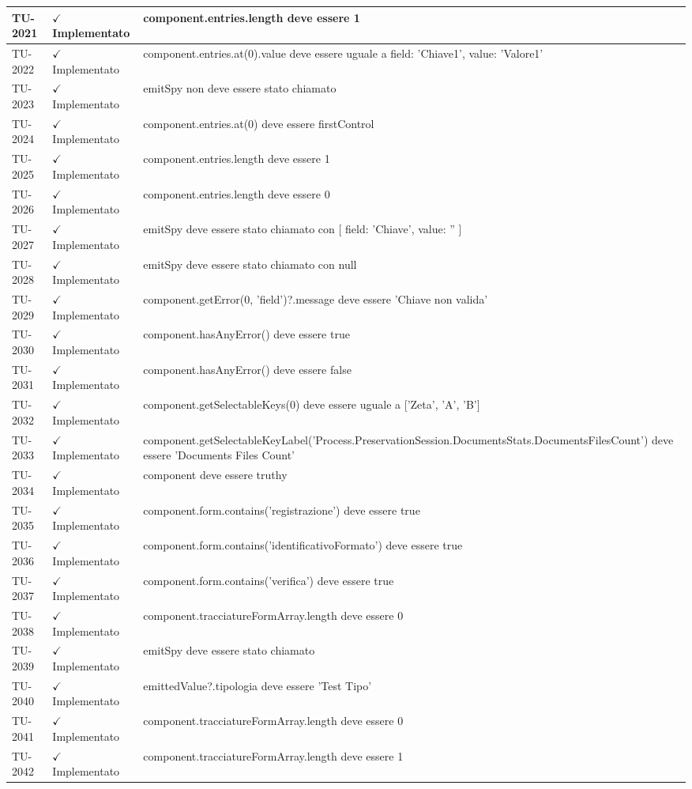 ﻿\documentclass[a4paper,12pt]{article}
\newcommand{\ok}{\textcolor{green!60!black}{$\checkmark$ Implementato}}
\begin{document}
\begin{longtable}{|p{2cm}|p{3.5cm}|p{9.5cm}|}
\hline
TU-2021 & \ok & component.entries.length deve essere 1 \\
\hline
TU-2022 & \ok & component.entries.at(0).value deve essere uguale a { field: 'Chiave1', value: 'Valore1' } \\
\hline
TU-2023 & \ok & emitSpy non deve essere stato chiamato \\
\hline
TU-2024 & \ok & component.entries.at(0) deve essere firstControl \\
\hline
TU-2025 & \ok & component.entries.length deve essere 1 \\
\hline
TU-2026 & \ok & component.entries.length deve essere 0 \\
\hline
TU-2027 & \ok & emitSpy deve essere stato chiamato con [{ field: 'Chiave', value: '' }] \\
\hline
TU-2028 & \ok & emitSpy deve essere stato chiamato con null \\
\hline
TU-2029 & \ok & component.getError(0, 'field')?.message deve essere 'Chiave non valida' \\
\hline
TU-2030 & \ok & component.hasAnyError() deve essere true \\
\hline
TU-2031 & \ok & component.hasAnyError() deve essere false \\
\hline
TU-2032 & \ok & component.getSelectableKeys(0) deve essere uguale a ['Zeta', 'A', 'B'] \\
\hline
TU-2033 & \ok & component.getSelectableKeyLabel('Process.PreservationSession.DocumentsStats.DocumentsFilesCount') deve essere 'Documents Files Count' \\
\hline
TU-2034 & \ok & component deve essere truthy \\
\hline
TU-2035 & \ok & component.form.contains('registrazione') deve essere true \\
\hline
TU-2036 & \ok & component.form.contains('identificativoFormato') deve essere true \\
\hline
TU-2037 & \ok & component.form.contains('verifica') deve essere true \\
\hline
TU-2038 & \ok & component.tracciatureFormArray.length deve essere 0 \\
\hline
TU-2039 & \ok & emitSpy deve essere stato chiamato \\
\hline
TU-2040 & \ok & emittedValue?.tipologia deve essere 'Test Tipo' \\
\hline
TU-2041 & \ok & component.tracciatureFormArray.length deve essere 0 \\
\hline
TU-2042 & \ok & component.tracciatureFormArray.length deve essere 1 \\

\end{longtable}
\end{document}
